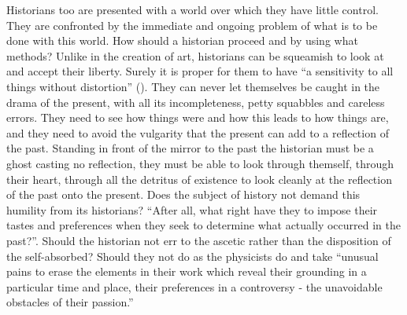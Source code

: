 Historians too
are presented with a world over which they %
have %
little control.
They are confronted by the immediate and ongoing problem of
what  is  to be done with this world.
How  should a historian proceed and by using what methods?
Unlike in the creation of art, historians can be squeamish to look at
and accept their liberty.  
Surely it is proper for them to have ``a sensitivity to all things
without distortion'' (\cite{FoucaultNietzcheGenealogyHistory}).
They can never let themselves be caught in the drama of the  present,
with all its incompleteness, petty squabbles and careless errors.
They need to see how things were and how this leads to how things are,
and they  need to avoid  the vulgarity that the present can add to a reflection of
the past.
Standing in front of the mirror to the past the historian 
must be a ghost casting no reflection, they must be able to look
through themself, through 
their heart, through all the detritus of existence to look cleanly at the
reflection of the past onto  the present.
Does the subject of
history not demand this humility
from its historians? ``After all,
what right have they to impose their tastes and preferences when they
seek to determine what actually occurred in the past?''.
Should the historian not err to the ascetic rather than the disposition
of the self-absorbed?  Should they not do as the physicists do and take
``unusual pains to erase the elements in their work
which reveal their grounding in a particular time and place, their
preferences in a controversy - the unavoidable obstacles of their
passion.'' 






